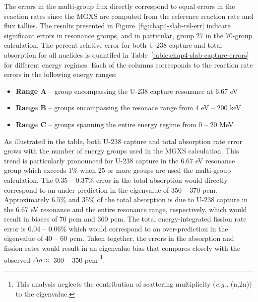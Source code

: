 The errors in the multi-group flux directly correspond to equal errors in the reaction rates since the \ac{MGXS} are computed from the reference reaction rate and flux tallies. The results presented in Figure~\ref{fig:chap4-slab-rel-err} indicate significant errors in resonance groups, and in particular, group 27 in the 70-group calculation. The percent relative error for both U-238 capture and total absorption for all nuclides is quantifed in Table~\ref{table:chap4-slab-capture-errors} for different energy regimes. Each of the columns corresponds to the reaction rate errors in the following energy ranges:

\vspace{-0.1in}
\begin{itemize}[noitemsep]
  \item {\bf Range A} -- group encompassing the U-238 capture resonance at 6.67 eV
  \item {\bf Range B} -- groups encompassing the resonace range from 4 eV -- 200 keV
  \item {\bf Range C} -- groups spanning the entire energy regime from 0 -- 20 MeV
\end{itemize}
\vspace{-0.1in}

As illustrated in the table, both U-238 capture and total absorption rate error grows with the number of energy groups used in the \ac{MGXS} calculation. This trend is particularly pronounced for U-238 capture in the 6.67 eV resonance group which exceeds 1\% when 25 or more groups are used the multi-group calculation. The 0.35 -- 0.37\% error in the total absorption would directly correspond to an under-prediction in the eigenvalue of 350 -- 370 pcm. Approximately 6.5\% and 35\% of the total absorption is due to U-238 capture in the 6.67 eV resonance and the entire resonance range, respectively, which would result in biases of 70 pcm and 360 pcm. The total energy-integrated fission rate error is 0.04 -- 0.06\% which would correspond to an over-prediction in the eigenvalue of 40 -- 60 pcm. Taken together, the errors in the absorption and fission rates would result in an eigenvalue bias that compares closely with the observed $\Delta\rho \approx$ 300 -- 350 pcm \footnote{This analysis neglects the contribution of scattering multiplicity (\textit{e.g.,} (n,2n)) to the eigenvalue.}.

